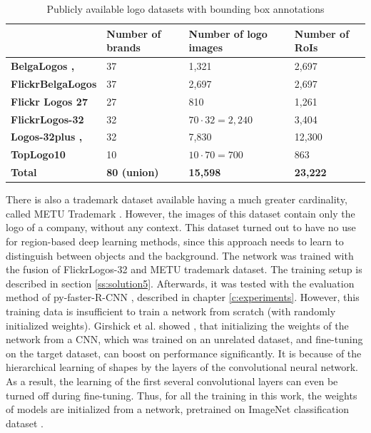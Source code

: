 \begin{table}[ht!]
\centering
\begin{tabular}{|l|l|l|l|}
\hline & \textbf{Number of brands} & \textbf{Number of logo images} & \textbf{Number of RoIs} \\
\hline
\textbf{BelgaLogos \cite{belgalogos09}, \cite{letessier2012scalable}} & 37 & 1,321 & 2,697 \\
\hline
\textbf{FlickrBelgaLogos \cite{letessier2012scalable}} & 37 & 2,697 & 2,697 \\
\hline
\textbf{Flickr Logos 27 \cite{619}} & 27 & 810 & 1,261 \\
\hline
\textbf{FlickrLogos-32 \cite{RombergICMR2011}} & 32 & $70 \cdot 32 = 2,240$ & 3,404 \\
\hline
\textbf{Logos-32plus \cite{bianco2017deep}, \cite{bianco2015logo}} & 32 & 7,830 & 12,300 \\
\hline
\textbf{TopLogo10 \cite{DBLP:journals/corr/SuZG16}} & 10 & $10 \cdot 70 = 700$ & 863 \\
\hline\hline
\textbf{Total} & \textbf{80 (union)} & \textbf{15,598} & \textbf{23,222} \\ \hline
\end{tabular}
\caption{Publicly available logo datasets with bounding box annotations}
\label{table:logodatasets}
\end{table}

There is also a trademark dataset available having a much greater cardinality, called METU Trademark \cite{DBLP:journals/corr/TursunAK17}. However, the images of this dataset contain only the logo of a company, without any context. This dataset turned out to have no use for region-based deep learning methods, since this approach needs to learn to distinguish between objects and the background. The network was trained with the fusion of FlickrLogos-32 and METU trademark dataset. The training setup is described in section \ref{ss:solution5}. Afterwards, it was tested with the evaluation method of py-faster-R-CNN \cite{Girshick2017} \cite{NIPS2015_5638}, described in chapter \ref{c:experiments}.
\bigbreak
However, this training data is insufficient to train a network from scratch (with randomly initialized weights). Girshick et al. showed \cite{DBLP:journals/corr/GirshickDDM13}, that initializing the weights of the network from a CNN, which was trained on an unrelated dataset, and fine-tuning on the target dataset, can boost on performance significantly. It is because of the hierarchical learning of shapes by the layers of the convolutional neural network. As a result, the learning of the first several convolutional layers can even be turned off during fine-tuning. Thus, for all the training in this work, the weights of models are initialized from a network, pretrained on ImageNet classification dataset \cite{imagenet_cvpr09}.
\bigbreak
